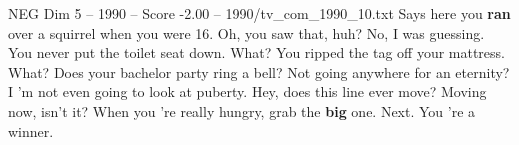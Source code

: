 \begin{textsample}{NEG Dim 5 – 1990 – Score -2.00 – 1990/tv\_com\_1990\_10.txt}  \label{ex:f5_neg_078}
Says here you \textbf{ran} over a squirrel when you were 16.
Oh, you saw that, huh?
No, I was guessing.
You never put the toilet seat down.
What?
You ripped the tag off your mattress.
What?
Does your bachelor party ring a bell?
Not going anywhere for an eternity?
I 'm not even going to look at puberty.
Hey, does this line ever move?
Moving now, isn't it?
When you 're really hungry, grab the \textbf{big} one.
Next.
You 're a winner.

\end{textsample}
